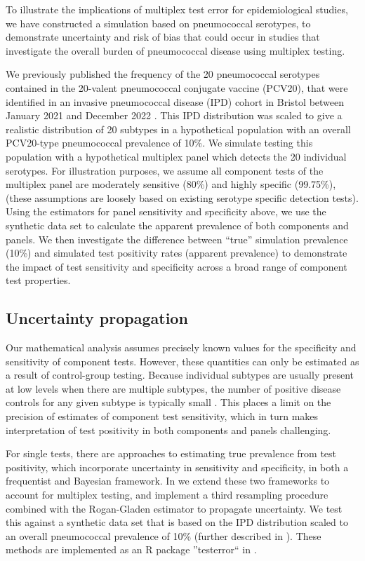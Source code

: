 \documentclass[10pt,letterpaper]{article}
\begin{document}
To illustrate the implications of multiplex test error for epidemiological studies, we have constructed a simulation based on pneumococcal serotypes, to demonstrate uncertainty and risk of bias that could occur in studies that investigate the overall burden of pneumococcal disease using multiplex testing. 

We previously published the frequency of the 20 pneumococcal serotypes contained in the 20-valent pneumococcal conjugate vaccine (PCV20), that were identified in an invasive pneumococcal disease (IPD) cohort in Bristol between January 2021 and December 2022 \cite{hyams2023a}. This IPD distribution was scaled to give a realistic distribution of 20 subtypes in a hypothetical population with an overall PCV20-type pneumococcal prevalence of 10\%. We simulate testing this population with a hypothetical multiplex panel which detects the 20 individual serotypes. For illustration purposes, we assume all component tests of the multiplex panel are moderately sensitive (80\%) and highly specific (99.75\%), (these assumptions are loosely based on existing serotype specific detection tests). Using the estimators for panel sensitivity and specificity above, we use the synthetic data set to calculate the apparent prevalence of both components and panels. We then investigate the difference between ``true'' simulation prevalence (10\%) and simulated test positivity rates (apparent prevalence) to demonstrate the impact of test sensitivity and specificity across a broad range of component test properties. 

\subsection*{Uncertainty propagation}

Our mathematical analysis assumes precisely known values for the specificity and sensitivity of component tests. However, these quantities can only be estimated as a result of control-group testing. Because individual subtypes are usually present at low levels when there are multiple subtypes, the number of positive disease controls for any given subtype is typically small \cite{bonten2015}. This places a limit on the precision of estimates of component test sensitivity, which in turn makes interpretation of test positivity in both components and panels challenging.

For single tests, there are approaches to estimating true prevalence from test positivity, which incorporate uncertainty in sensitivity and specificity, in both a frequentist\cite{lang2014,thomas2022,flor2020} and Bayesian framework\cite{gelman2020,flor2020}. In  we extend these two frameworks to account for multiplex testing, and implement a third resampling procedure combined with the Rogan-Gladen estimator to propagate uncertainty. We test this against a synthetic data set that is based on the IPD distribution scaled to an overall pneumococcal prevalence of 10\% (further described in ). These methods are implemented as an R package ''testerror`` in .
\end{document}
